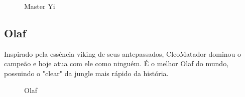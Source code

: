 \begin{multicols}{2}
	\begin{figure}[H]
		\begin{center}
		\end{center}
		\caption{Master Yi}
		\label{fig:fig3}
	\end{figure}
	\subsection*{Olaf}
	Inspirado pela essência viking de seus antepassados, CleoMatador dominou o campeão e hoje atua com ele como ninguém. É o melhor Olaf do mundo, possuindo o "clear" da jungle mais rápido da história.
	
	\begin{figure}[H]
		\begin{center}
		\end{center}
		\caption{Olaf}
		\label{fig:fig4}
	\end{figure}
	

\end{multicols}

